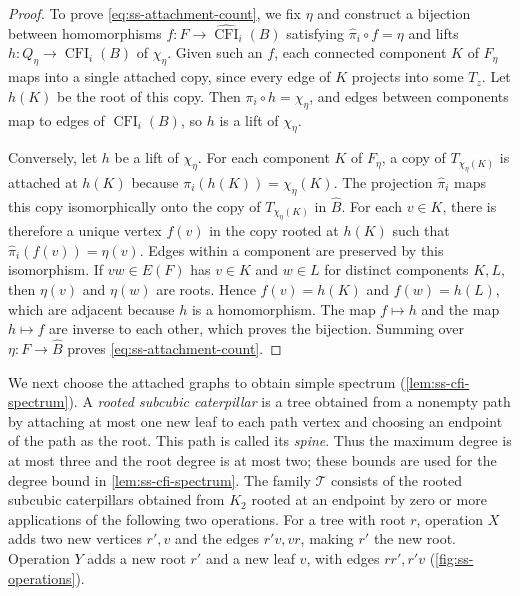 \documentclass[10pt,a4paper]{article}
\theoremstyle{plain}
\theoremstyle{definition}
\DeclareMathOperator{\CFI}{CFI}
\begin{document}
\begin{proof}
To prove \cref{eq:ss-attachment-count}, we fix $\eta$ and construct a
bijection between homomorphisms
$f:F\to\widehat{\CFI}_i(B)$ satisfying $\widehat\pi_i\circ f=\eta$
and lifts $h:Q_\eta\to\CFI_i(B)$ of $\chi_\eta$.
Given such an $f$, each connected component $K$ of $F_\eta$ maps
into a single attached copy, since every edge of $K$ projects into some
$T_z$. Let $h(K)$ be the root of this copy.
Then $\pi_i\circ h=\chi_\eta$, and edges between components map to edges
of $\CFI_i(B)$, so $h$ is a lift of $\chi_\eta$.

Conversely, let $h$ be a lift of $\chi_\eta$.
For each component $K$ of $F_\eta$, a copy of $T_{\chi_\eta(K)}$
is attached at $h(K)$ because $\pi_i(h(K))=\chi_\eta(K)$.
The projection $\widehat\pi_i$ maps this copy isomorphically onto
the copy of $T_{\chi_\eta(K)}$ in $\widehat B$.
For each $v\in K$, there is therefore a unique vertex $f(v)$ in the
copy rooted at $h(K)$ such that $\widehat\pi_i(f(v))=\eta(v)$.
Edges within a component are preserved by this isomorphism.
If $vw\in E(F)$ has $v\in K$ and $w\in L$ for distinct components $K,L$, then $\eta(v)$ and
$\eta(w)$ are roots. Hence $f(v)=h(K)$ and $f(w)=h(L)$, which are
adjacent because $h$ is a homomorphism.
The map $f\mapsto h$ and the map $h\mapsto f$ are inverse to each
other, which proves the bijection.
Summing over $\eta:F\to\widehat B$ proves \cref{eq:ss-attachment-count}.
\end{proof}

We next choose the attached graphs to obtain simple spectrum
(\cref{lem:ss-cfi-spectrum}).
A \emph{rooted subcubic caterpillar} is a tree obtained from a nonempty path
by attaching at most one new leaf to each path vertex and choosing an
endpoint of the path as the root. This path is called its \emph{spine}.
Thus the maximum degree is at most three and
the root degree is at most two; these bounds are used for the degree
bound in \cref{lem:ss-cfi-spectrum}.
The family $\mathcal T$ consists of the rooted subcubic caterpillars
obtained from $K_2$ rooted at an endpoint by zero or more applications
of the following two operations.
For a tree with root $r$, operation $X$ adds two new vertices $r',v$
and the edges $r'v,vr$, making $r'$ the new root.
Operation $Y$ adds a new root $r'$ and a new leaf $v$, with edges
$rr',r'v$ (\cref{fig:ss-operations}).
\end{document}
